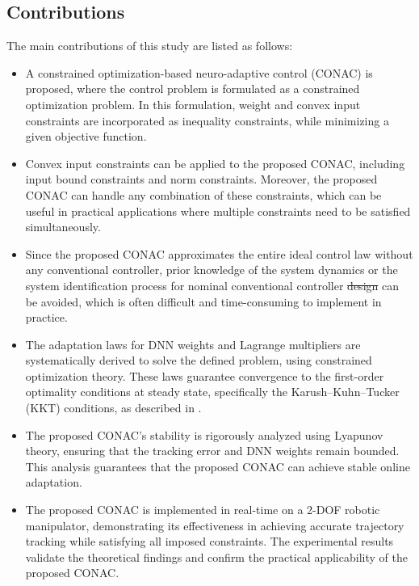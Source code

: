 \documentclass[letterpaper, journal]{IEEEtran}
\providecommand{\DIFadd}[1]{{\protect\color{blue}\uwave{#1}}} %
\providecommand{\DIFdel}[1]{{\protect\color{red}\sout{#1}}} %
\providecommand{\DIFaddbegin}{} %
\providecommand{\DIFaddend}{} %
\providecommand{\DIFdelbegin}{} %
\providecommand{\DIFdelend}{} %
\begin{document}
\subsection{Contributions}

The main contributions of this study are listed as follows:
\begin{itemize}
    \item A constrained optimization-based neuro-adaptive control (CONAC) is proposed, where the control problem is formulated as a constrained optimization problem. In this formulation, weight and convex input constraints are incorporated as inequality constraints, while minimizing a given objective function.
    \item Convex input constraints can be applied to the proposed CONAC, including input bound constraints and norm constraints. Moreover, the proposed CONAC can handle any combination of these constraints, which can be useful in practical applications where multiple constraints need to be satisfied simultaneously.
    \item Since the proposed CONAC approximates the entire ideal control law without any conventional controller, prior knowledge of the system dynamics or the system identification process for \DIFaddbegin \DIFadd{designing a }\DIFaddend nominal conventional controller \DIFdelbegin \DIFdel{design }\DIFdelend can be avoided, which is often difficult and time-consuming to implement in practice. 
    \item The adaptation laws for DNN weights and Lagrange multipliers are systematically derived to solve the defined problem, using constrained optimization theory. These laws guarantee convergence to the first-order optimality conditions at steady state, specifically the Karush–Kuhn–Tucker (KKT) conditions, as described in \cite[Chap. 12, Thm. 12.1]{Nocedal:2006aa}.
    \item The proposed CONAC's stability is rigorously analyzed using Lyapunov theory, ensuring that the tracking error and DNN weights remain bounded. This analysis guarantees that the proposed CONAC can achieve stable online adaptation.
    \item The proposed CONAC is implemented in real-time on a 2-DOF robotic manipulator, demonstrating its effectiveness in achieving accurate trajectory tracking while satisfying all imposed constraints. The experimental results validate the theoretical findings and confirm the practical applicability of the proposed CONAC.
\end{itemize}
\end{document}
